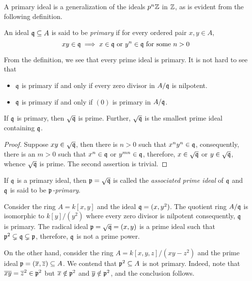 A primary ideal is a generalization of the ideals $p^n\mathbb{Z}$ in $\mathbb{Z}$, as is evident from the following definition.

\begin{definition}
    An ideal $\mathfrak q\subseteq A$ is said to be \textit{primary} if for every ordered pair $x,y\in A$,
    \begin{equation*}
        xy\in\mathfrak q\implies x\in\mathfrak q\text{ or }y^n\in\mathfrak q\text{ for some } n > 0
    \end{equation*}
\end{definition}


From the definition, we see that every prime ideal is primary. It is not hard to see that
\begin{itemize}
\item $\mathfrak q$ is primary if and only if every zero divisor in $A/\mathfrak q$ is nilpotent. 
\item $\mathfrak q$ is primary if and only if $(0)$ is primary in $A/\mathfrak q$.
\end{itemize}


\begin{proposition}
    If $\mathfrak q$ is primary, then $\sqrt{\mathfrak q}$ is prime. Further, $\sqrt{\mathfrak q}$ is the smallest prime ideal containing $\mathfrak q$.
\end{proposition}
\begin{proof}
    Suppose $xy\in\sqrt{\mathfrak q}$, then there is $n > 0$ such that $x^ny^n\in\mathfrak q$, consequently, there is an $m > 0$ such that $x^n\in\mathfrak q$ or $y^{mn}\in\mathfrak q$, therefore, $x\in\sqrt{\mathfrak q}$ or $y\in\sqrt{\mathfrak q}$, whence $\sqrt{\mathfrak q}$ is prime. The second assertion is trivial.
\end{proof}

If $\mathfrak q$ is a primary ideal, then $\mathfrak p = \sqrt{\mathfrak q}$ is called the \textit{associated prime ideal} of $\mathfrak q$ and $\mathfrak q$ is said to be \textit{$\mathfrak p$-primary}.

Consider the ring $A = k[x,y]$ and the ideal $\mathfrak q = (x,y^2)$. The quotient ring $A/\mathfrak q$ is isomorphic to $k[y]/(y^2)$ where every zero divisor is nilpotent consequently, $\mathfrak q$ is primary. The radical ideal $\mathfrak p = \sqrt{\mathfrak q} = (x,y)$ is a prime ideal such that $\mathfrak p^2\subsetneq\mathfrak q\subsetneq\mathfrak p$, therefore, $\mathfrak q$ is not a prime power.

On the other hand, consider the ring $A = k[x,y,z]/(xy - z^2)$ and the prime ideal $\mathfrak p = (\overline x,\overline z)\subseteq A$. We contend that $\mathfrak p^2\subseteq A$ is not primary. Indeed, note that $\overline x\overline y = \overline z^2\in\mathfrak p^2$ but $\overline x\notin\mathfrak p^2$ and $\overline y\notin\mathfrak p^2$, and the conclusion follows.

